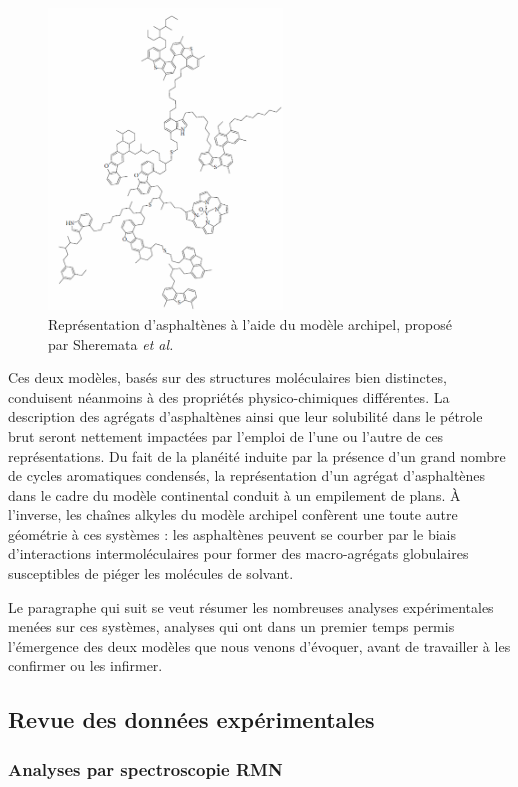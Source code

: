 \begin{figure}[h!]
	\centering
	\includegraphics[height=8cm]{image/Sher}
	\caption[Molecule d'asphaltènes type archipel]{Représentation d'asphaltènes à l'aide du modèle archipel, proposé par Sheremata \textit{et al.}\cite{sheremata2004quantitative}}
	\label{fig2}
\end{figure}

Ces deux modèles, basés sur des structures moléculaires bien distinctes, conduisent néanmoins à des propriétés physico-chimiques différentes. La description des agrégats d'asphaltènes ainsi que leur solubilité dans le pétrole brut seront nettement impactées par l'emploi de l'une ou l'autre de ces représentations. Du fait de la planéité induite par la présence d'un grand nombre de cycles aromatiques condensés, la représentation d'un agrégat d'asphaltènes dans le cadre du modèle continental conduit à un empilement de plans. À l'inverse, les chaînes alkyles du modèle archipel confèrent une toute autre géométrie à ces systèmes : les asphaltènes peuvent se courber par le biais d'interactions intermoléculaires pour former des macro-agrégats globulaires susceptibles de piéger les molécules de solvant. \bigskip

Le paragraphe qui suit se veut résumer les nombreuses analyses expérimentales menées sur ces systèmes, analyses qui ont dans un premier temps permis l'émergence des deux modèles que nous venons d'évoquer, avant de travailler à les confirmer ou les infirmer. 

\subsection{Revue des données expérimentales}

\subsubsection{Analyses par spectroscopie RMN}

